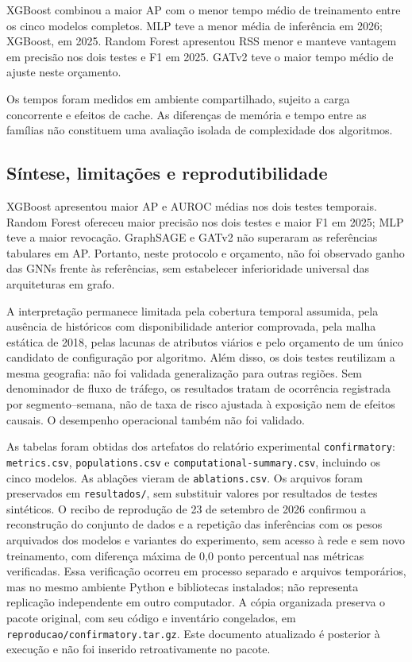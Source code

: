\documentclass[12pt]{article}
\begin{document}
XGBoost combinou a maior AP com o menor tempo médio de treinamento
entre os cinco modelos completos. MLP teve a menor média de
inferência em 2026; XGBoost, em 2025. Random Forest apresentou RSS
menor e manteve vantagem em precisão nos dois testes e F1 em 2025.
GATv2 teve o maior tempo médio de ajuste neste orçamento.

Os tempos foram medidos em ambiente compartilhado, sujeito a carga
concorrente e efeitos de cache. As diferenças de memória e tempo entre
as famílias não constituem uma avaliação isolada de
complexidade dos algoritmos.

\subsection{Síntese, limitações e reprodutibilidade}

XGBoost apresentou maior AP e AUROC médias nos dois testes temporais.
Random Forest ofereceu maior precisão nos dois testes e maior F1 em
2025; MLP teve a maior revocação. GraphSAGE e GATv2 não superaram as
referências tabulares em AP. Portanto, neste protocolo e orçamento,
não foi observado ganho das GNNs frente às referências, sem
estabelecer inferioridade universal das arquiteturas em grafo.

A interpretação permanece limitada pela cobertura temporal assumida,
pela ausência de históricos com disponibilidade anterior comprovada,
pela malha estática de 2018, pelas lacunas de atributos viários e pelo
orçamento de um único candidato de configuração por algoritmo. Além
disso, os dois testes reutilizam a mesma geografia: não foi validada
generalização para outras regiões. Sem denominador de fluxo de
tráfego, os resultados tratam de ocorrência registrada por
segmento--semana, não de taxa de risco ajustada à exposição nem de
efeitos causais. O desempenho operacional também não foi validado.

As tabelas foram obtidas dos artefatos do relatório experimental
\texttt{confirmatory}: \texttt{metrics.csv}, \texttt{populations.csv}
e \texttt{computational-summary.csv}, incluindo os cinco modelos.
As ablações vieram de \texttt{ablations.csv}. Os arquivos foram
preservados em \texttt{resultados/}, sem substituir valores por
resultados de testes sintéticos.
O recibo de reprodução de 23 de setembro de 2026 confirmou a
reconstrução do conjunto de dados e a repetição das inferências com
os pesos arquivados dos modelos e variantes do experimento,
sem acesso à rede e sem novo treinamento, com diferença máxima de 0,0
ponto percentual nas métricas verificadas. Essa verificação ocorreu em
processo separado e arquivos temporários, mas no mesmo ambiente Python
e bibliotecas instalados; não representa
replicação independente em outro computador. A cópia organizada
preserva o pacote original, com seu código e inventário congelados,
em \texttt{reproducao/confirmatory.tar.gz}. Este documento atualizado
é posterior à execução e não foi inserido retroativamente no pacote.
\end{document}
